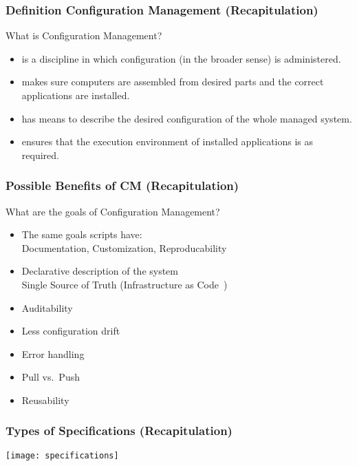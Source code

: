 \begin{frame}
	\frametitle{Definition Configuration Management (Recapitulation)}

	\begin{task}
	What is Configuration Management?
	\end{task}

	\pause

	\begin{itemize}
	\item is a discipline in which configuration (in the broader sense) is administered.
	\item makes sure computers are assembled from desired parts and the correct applications are installed.
	\item has means to describe the desired configuration of the whole managed system.
	\item ensures that the execution environment of installed applications is as required.
	\end{itemize}
\end{frame}

\begin{frame}
	\frametitle{Possible Benefits of CM (Recapitulation)}

	\begin{task}
	What are the goals of Configuration Management?
	\end{task}

	\pause

	\begin{itemize} %
	\item The same goals scripts have: \\
		Documentation, Customization, Reproducability
	\item Declarative description of the system \\
		Single Source of Truth 
		(Infrastructure as Code~\cite{waldemar2013testing})
	\item Auditability
	\item Less configuration drift
	\item Error handling
	\item Pull vs.\ Push
	\item Reusability
	\end{itemize}
\end{frame}

\begin{frame}
	\frametitle{Types of Specifications (Recapitulation)}

	\texttt{[image: specifications]}
\end{frame}


